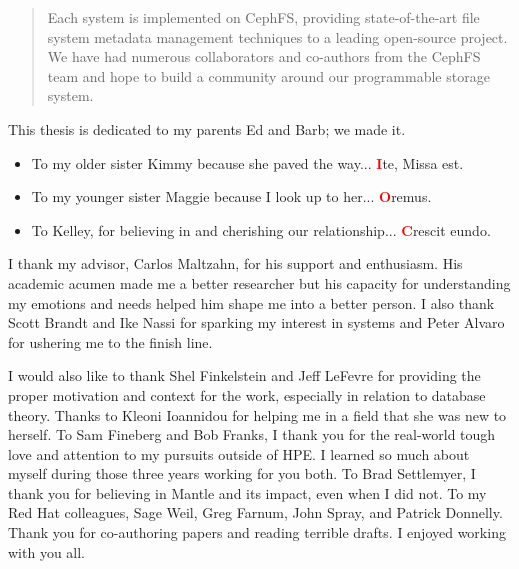 \begin{frontmatter}
\begin{abstract}
Each system is implemented on CephFS, providing state-of-the-art file system
metadata management techniques to a leading open-source project. We have had
numerous collaborators and co-authors from the CephFS team and hope to build a
community around our programmable storage system.

	\end{abstract}
	\begin{dedication}
                \vspace*{\fill}
                \noindent This thesis is dedicated to my parents Ed and Barb; we made it.
                \begin{itemize}
                  \item[] To my older sister Kimmy because she paved the way...  {\huge\textbf{\textcolor{red}{I}}}te, Missa est.
                  \item[] To my younger sister Maggie because I look up to her...  {\huge\textbf{\textcolor{red}{O}}}remus.
                  \item[] To Kelley, for believing in and cherishing our  relationship... {\huge\textbf{\textcolor{red}{C}}}rescit eundo.
                \end{itemize}
                \vspace*{\fill}
	\end{dedication}
	\begin{acknowledgements}

I thank my advisor, Carlos Maltzahn, for his support and enthusiasm. His
academic acumen made me a better researcher but his capacity for understanding
my emotions and needs helped him shape me into a better person. I also thank
Scott Brandt and Ike Nassi for sparking my interest in systems and Peter Alvaro
for ushering me to the finish line.

I would also like to thank Shel Finkelstein and Jeff LeFevre for providing the
proper motivation and context for the work, especially in relation to database
theory. Thanks to Kleoni Ioannidou for helping me in a field that she was new
to herself. To Sam Fineberg and Bob Franks, I thank you for the real-world
tough love and attention to my pursuits outside of HPE.  I learned so much
about myself during those three years working for you both. To Brad Settlemyer,
I thank you for believing in Mantle and its impact, even when I did not.  To my
Red Hat colleagues, Sage Weil, Greg Farnum, John Spray, and Patrick Donnelly.
Thank you for co-authoring papers and reading terrible drafts. I enjoyed
working with you all.


\end{acknowledgements}
\end{frontmatter}
